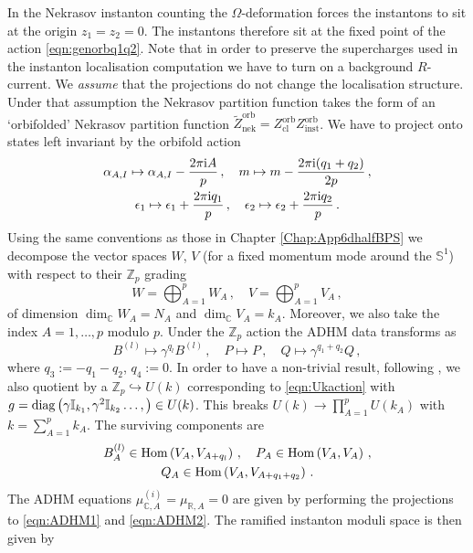 \documentclass[main.tex]{subfiles}
\begin{document}
In the Nekrasov instanton counting the $\Omega$-deformation forces the instantons to sit at the origin $z_1=z_2=0$. The instantons therefore sit at the fixed point of the action \eqref{eqn:genorbq1q2}.
Note that in order to preserve the supercharges used in the instanton localisation computation we have to turn on a background $R$-current.
We \textit{assume} that the projections do not change the localisation structure. Under that assumption the Nekrasov partition function takes the form of an `orbifolded' Nekrasov partition function $\widetilde{Z}_{\text{nek}}^{\text{orb}}=Z_{\text{cl}}^{\text{orb}}Z_{\text{inst}}^{\text{orb}}$. We have to project onto states left invariant by the orbifold action 
\begin{gather}
\alpha_{A,I}\mapsto\alpha_{A,I}-\frac{2\pi\mathrm{i} A}{p}\,,\quad m\mapsto m-\frac{2\pi\mathrm{i} (q_1+q_2)}{2p}\,,\label{eqn:trans1}\\
\epsilon_1\mapsto \epsilon_1+\frac{2\pi\mathrm{i} q_{1}}{p}\,,\quad \epsilon_2 \mapsto \epsilon_2+\frac{2\pi\mathrm{i} q_{2}}{p}\label{eqn:trans2}\,.
\end{gather}
Using the same conventions as those in Chapter \ref{Chap:App6dhalfBPS} we decompose the vector spaces $W$, $V$ (for a fixed momentum mode around the $\mathbb{S}^1$) with respect to their $\mathbb{Z}_p$ grading
\begin{equation}
W=\bigoplus_{A=1}^pW_A\,,\quad V=\bigoplus_{A=1}^pV_A\,,
\end{equation}
of dimension $\dim_{\mathbb{C}}W_A=N_A$ and $\dim_{\mathbb{C}}V_A=k_A$. Moreover, we also take the index $A=1,\dots,p$ modulo $p$.
Under the $\mathbb{Z}_p$ action the ADHM data transforms as
\begin{equation}
B^{(l)}\mapsto\gamma^{q_{l}}B^{(l)}\,,\quad
P\mapsto P\,,\quad Q\mapsto\gamma^{q_1+q_2}Q\,,
\end{equation}
where $q_3:=-q_1-q_2$, $q_4:=0$.
In order to have a non-trivial result, following \cite{Douglas:1996sw}, we also quotient by a $\mathbb{Z}_p\hookrightarrow U(k)$ corresponding to \eqref{eqn:Ukaction} with $g=\operatorname{diag}\left(\gamma\mathbb{I}_{k_1},\gamma^2\mathbb{I}_{k_2}\dots,\right)\in U(k)$. This breaks $U(k)\to\prod_{A=1}^pU(k_A)$ with $k=\sum_{A=1}^pk_A$. The surviving components are 
\begin{gather}
B^{(l)}_{A}\in\operatorname{Hom}\left(V_A,V_{A+q_{l}}\right)\,,\quad P_{A}\in\operatorname{Hom}\left(V_A,V_{A}\right)\,,\\ Q_{A}\in\operatorname{Hom}\left(V_A,V_{A+q_{1}+q_{2}}\right)\,.
\end{gather}
The ADHM equations $\mu^{(i)}_{\mathbb{C},A}=\mu_{\mathbb{R},A}=0$ are given by performing the projections to \eqref{eqn:ADHM1} and \eqref{eqn:ADHM2}. The ramified instanton moduli space is then given by 
\end{document}
